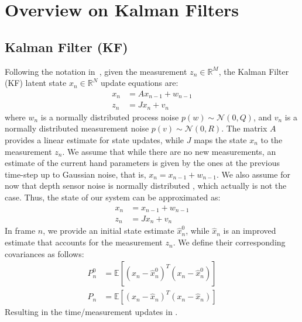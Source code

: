 \appendix

\section{Overview on Kalman Filters}

\subsection{Kalman Filter (KF)} 
\label{app:kalman}
Following the notation in~\cite{welch1995introduction}, given the measurement $z_n \in \mathbb{R}^M$, the Kalman Filter (KF) latent state $x_n \in \mathbb{R}^N$ update equations are:
% 
\begin{align}
x_n &= A x_{n - 1} +  w_{n - 1} \\
z_n &= J x_n + v_n
\end{align}
% 
where $w_n$ is a normally distributed process noise $p(w) \sim \mathcal{N}(0, Q)$, and $v_n$ is a normally distributed measurement noise $p(v) \sim \mathcal{N}(0, R)$. The matrix $A$ provides a linear estimate for state updates, while $J$ maps the state $x_n$ to the measurement $z_n$.
We assume that while there are no new measurements, an estimate of the current hand parameters is given by the ones at the previous time-step up to Gaussian noise, that is, $x_n = x_{n-1} + w_{n-1}$. We also assume for now that depth sensor noise is normally distributed , which actually is not the case. Thus, the state of our system can be approximated as:
% 
\begin{align}
x_n &= x_{n - 1} + w_{n - 1} \\
z_n &= J x_n + v_n
\end{align}
% 
In frame $n$, we provide an initial state estimate $\hat{x}_n^0$, while $\hat{x}_n$ is an improved estimate that accounts for the measurement $z_n$. We define their corresponding covariances as follows: 
% 
\begin{align}
P_n^0 &= \mathbb{E}[(x_n - \hat{x}_n^0)^T(x_n - \hat{x}_n^0)]\\
P_n   &= \mathbb{E}[(x_n - \hat{x}_n)^T(x_n - \hat{x}_n)]
\end{align}
%
Resulting in the time/measurement updates in .

